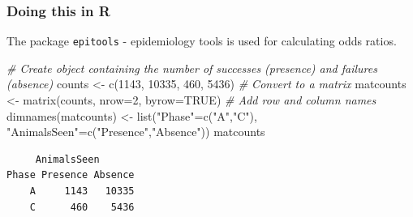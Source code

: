 \documentclass[
  oneside]{krantz}
\newenvironment{Shaded}{\begin{snugshade}}{\end{snugshade}}
\newcommand{\AttributeTok}[1]{\textcolor[rgb]{0.77,0.63,0.00}{#1}}
\newcommand{\CommentTok}[1]{\textcolor[rgb]{0.56,0.35,0.01}{\textit{#1}}}
\newcommand{\ConstantTok}[1]{\textcolor[rgb]{0.00,0.00,0.00}{#1}}
\newcommand{\DecValTok}[1]{\textcolor[rgb]{0.00,0.00,0.81}{#1}}
\newcommand{\FunctionTok}[1]{\textcolor[rgb]{0.00,0.00,0.00}{#1}}
\newcommand{\NormalTok}[1]{#1}
\newcommand{\OtherTok}[1]{\textcolor[rgb]{0.56,0.35,0.01}{#1}}
\newcommand{\SpecialCharTok}[1]{\textcolor[rgb]{0.00,0.00,0.00}{#1}}
\newcommand{\StringTok}[1]{\textcolor[rgb]{0.31,0.60,0.02}{#1}}
\begin{document}
\hypertarget{doing-this-in-r-21}{%
\subsubsection{Doing this in R}\label{doing-this-in-r-21}}

The package \texttt{epitools} - epidemiology tools \citep{R-epitools} is used for calculating odds ratios.

\begin{Shaded}
\begin{Highlighting}[]
\CommentTok{\# Create object containing the number of successes (presence) and failures (absence)}
\NormalTok{counts }\OtherTok{\textless{}{-}} \FunctionTok{c}\NormalTok{(}\DecValTok{1143}\NormalTok{, }\DecValTok{10335}\NormalTok{, }\DecValTok{460}\NormalTok{, }\DecValTok{5436}\NormalTok{)}
\CommentTok{\# Convert to a matrix}
\NormalTok{matcounts }\OtherTok{\textless{}{-}} \FunctionTok{matrix}\NormalTok{(counts, }\AttributeTok{nrow=}\DecValTok{2}\NormalTok{, }\AttributeTok{byrow=}\ConstantTok{TRUE}\NormalTok{)}
\CommentTok{\# Add row and column names}
\FunctionTok{dimnames}\NormalTok{(matcounts) }\OtherTok{\textless{}{-}} \FunctionTok{list}\NormalTok{(}\StringTok{"Phase"}\OtherTok{=}\FunctionTok{c}\NormalTok{(}\StringTok{"A"}\NormalTok{,}\StringTok{"C"}\NormalTok{), }\StringTok{"AnimalsSeen"}\OtherTok{=}\FunctionTok{c}\NormalTok{(}\StringTok{"Presence"}\NormalTok{,}\StringTok{"Absence"}\NormalTok{))}
\NormalTok{matcounts}
\end{Highlighting}
\end{Shaded}

\begin{verbatim}
     AnimalsSeen
Phase Presence Absence
    A     1143   10335
    C      460    5436
\end{verbatim}

\begin{Shaded}
\end{Shaded}
\end{document}
